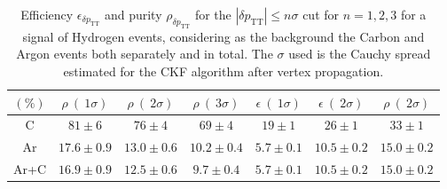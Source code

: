 \begin{table}
    \centering
    \begin{tabular}{||c|c|c|c|c|c|c||}
         \hline
          $(\%)$&  $\rho \ (\ 1\sigma)$&  $\rho \ (\ 2\sigma)$&  $\rho \ (\ 3\sigma)$&  $\epsilon \ (\ 1\sigma)$&  $\epsilon \ (\ 2\sigma)$&  $\rho \ (\ 2\sigma)$\\
         \hline \hline
         C &  $81\pm6$&  $76\pm4$ & $69\pm4$  &  $19\pm1$& $26\pm1$ &$33\pm1$ \\
         \hline
         Ar &  $17.6\pm0.9$& $13.0\pm0.6$ & $10.2\pm0.4$ & $5.7\pm0.1$ & $10.5\pm0.2$ & $15.0\pm0.2$\\
         \hline
         Ar+C& $16.9\pm0.9$ & $12.5\pm0.6$ & $9.7\pm0.4$ & $5.7\pm0.1$  & $10.5\pm0.2$ & $15.0\pm0.2$\\
         \hline
    \end{tabular}
    \caption{Efficiency $\epsilon_{\delta p_\text{TT}}$ and purity $\rho_{\delta p_\text{TT}}$ for the $|\delta p_\text{TT}|\leq n\sigma$ cut for $n=1,2,3$ for a signal of Hydrogen events, considering as the background the Carbon and Argon events both separately and in total. The $\sigma$ used is the Cauchy spread estimated for the CKF algorithm after vertex propagation.}
    \label{tab:dpTT_eff+pur}
\end{table}



